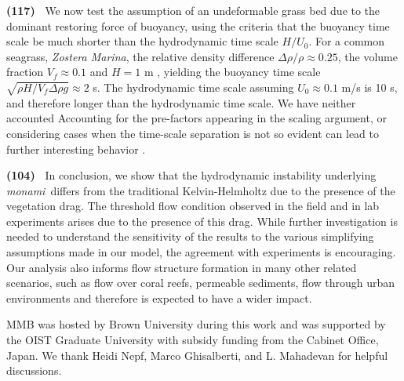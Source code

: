 \documentclass[aps,prl,reprint,twocolumn,superscriptaddress,sort&compress,10pt]{revtex4-1}  %
\newcommand{\monami}{\textit{monami}}
\newcommand{\words}[1]{\textbf{(#1)~}}
\begin{document}
\words{117} We now test the assumption of an undeformable grass bed due to the dominant restoring force of buoyancy, using the criteria that the buoyancy time scale be much shorter than the hydrodynamic time scale $H/U_0$.
For a common seagrass, \textit{Zostera Marina}, the relative density difference $\Delta \rho /\rho \approx 0.25$, the volume fraction $V_f \approx 0.1$ and $H=1$ m \cite{Fonseca98}, yielding the buoyancy time scale $\sqrt{\rho H/V_f \Delta \rho g} \approx 2$ s.
The hydrodynamic time scale assuming $U_0 \approx 0.1$ m/s is 10 s, and therefore longer than the hydrodynamic time scale.
We have neither accounted 
Accounting for the pre-factors appearing in the scaling argument, or considering cases when the time-scale separation is not so evident can lead to further interesting behavior \cite{Delangre06}.


\words{104} In conclusion, we show that the hydrodynamic instability underlying \monami ~differs from the traditional Kelvin-Helmholtz due to the presence of the vegetation drag. 
The threshold flow condition observed in the field and in lab experiments arises due to the presence of this drag. 
While further investigation is needed to understand the sensitivity of the results to the various simplifying assumptions made in our model, the agreement with experiments is encouraging.
Our analysis also informs flow structure formation in many other related scenarios, such as flow over coral reefs, permeable sediments, flow through urban environments and therefore is expected to have a wider impact.

\acknowledgments
MMB was hosted by Brown University during this work and was supported by the OIST Graduate University with subsidy funding from the Cabinet Office, Japan. We thank Heidi Nepf, Marco Ghisalberti, and L. Mahadevan for helpful discussions.
{}
% 

\end{document}
